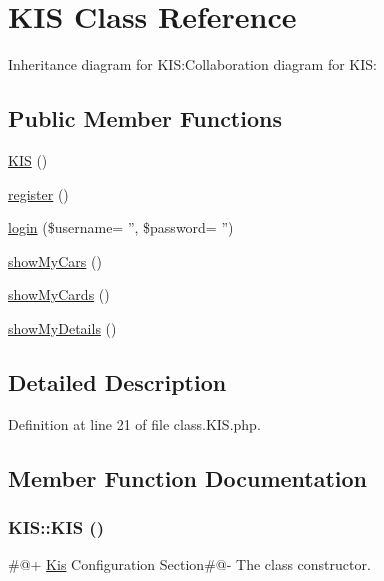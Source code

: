 \hypertarget{class_k_i_s}{
\section{KIS Class Reference}
\label{class_k_i_s}
}
Inheritance diagram for KIS:Collaboration diagram for KIS:\subsection*{Public Member Functions}
\begin{CompactItemize}
\item 
\hyperlink{class_k_i_s_858e7526bfe5655e9531e5c219c80a74}{KIS} ()
\item 
\hypertarget{class_k_i_s_b9856969c9484e36638e683c377d4d2f}{
\hyperlink{class_k_i_s_b9856969c9484e36638e683c377d4d2f}{register} ()}
\label{class_k_i_s_b9856969c9484e36638e683c377d4d2f}

\item 
\hyperlink{class_k_i_s_46fbc5ab041178822e533227438a32ad}{login} (\$username= '', \$password= '')
\item 
\hyperlink{class_k_i_s_825b8a492e9a28367225290f7aa3bcdc}{showMyCars} ()
\item 
\hyperlink{class_k_i_s_1240f8ba6583cec08f13f1922428df24}{showMyCards} ()
\item 
\hyperlink{class_k_i_s_889d57cd0b4360c4e4b48fce626b19cb}{showMyDetails} ()
\end{CompactItemize}


\subsection{Detailed Description}


Definition at line 21 of file class.KIS.php.

\subsection{Member Function Documentation}
\hypertarget{class_k_i_s_858e7526bfe5655e9531e5c219c80a74}{
\subsubsection{\setlength{\rightskip}{0pt plus 5cm}KIS::KIS ()}}
\label{class_k_i_s_858e7526bfe5655e9531e5c219c80a74}


\#@+ \hyperlink{namespace_kis}{Kis} Configuration Section\#@- The class constructor. 

